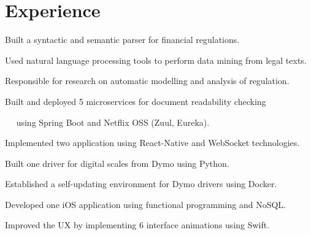 \section{Experience}

\begin{experience}[from = May 2019,
    company = RegulAItion,
    position = Software Engineer,
    key = {Developed a question generator for legal English using Kotlin.}]
\item Built a syntactic and semantic parser for financial regulations.
\item Used natural language processing tools to perform data mining from legal texts.
\item Responsible for research on automatic modelling and analysis of regulation.
\item Built and deployed 5 microservices for document readability checking
\item $\quad$ using Spring Boot and Netflix OSS (Zuul, Eureka).
\end{experience}

\begin{experience}[from = July 2018,
    until = December 2018,
    company = X2Mobile,
    position = Software Developer,
    key = {Used behaviour-driven development to increase the product's testability by 24\%.}]
\item Implemented two application using React-Native and WebSocket technologies.
\item Built one driver for digital scales from Dymo using Python.
\item Established a self-updating environment for Dymo drivers using Docker.
\end{experience}

\begin{experience}[from = June 2018,
    until = August 2018,
    company = SniperLabs,
    position = Swift Developer Intern,
    key = {Implemented $\approx240$ test cases using test-driven development.}]
\item Developed one iOS application using functional programming and NoSQL.
\item Improved the UX by implementing 6 interface animations using Swift.
\end{experience}